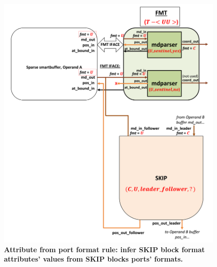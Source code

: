 \begin{figure}[ht]
\includegraphics[width=\textwidth]{figures/safinference_build_09skipfmtattrs.png}
\caption{\textbf{Attribute from port format rule: infer SKIP block format attributes' values from SKIP blocks ports' formats.}}
\label{fig:safinference_build_09skipfmtattrs}
\centering
\end{figure}



